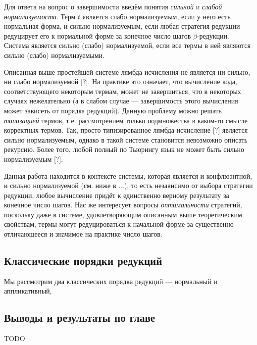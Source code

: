 \documentclass[../diploma.tex]{subfiles}
\begin{document}
Для ответа на вопрос о завершимости введём понятия \textit{сильной} и \textit{слабой нормализуемости}. Терм $t$ является слабо нормализуемым, если у него есть нормальная форма, и сильно нормализуемым, если любая стратегия редукции редуцирует его к нормальной форме за конечное число шагов $\beta$-редукции. Система является сильно (слабо) нормализуемой, если все термы в ней являются сильно (слабо) нормализуемыми.

Описанная выше простейшей системе лямбда-исчисления не является ни сильно, ни слабо нормализуемой [?]. На практике это означает, что вычисление кода, соответствующего некоторым термам, может не завершиться, что в некоторых случаях нежелательно (а в слабом случае --- завершимость этого вычисления может зависеть от порядка редукций). Данную проблему можно решать \textit{типизацией} термов, т.е. рассмотрением только подмножества в каком-то смысле корректных термов. Так, просто типизированное лямбда-исчисление [?] является сильно нормализуемым, однако в такой системе становится невозможно описать рекурсию. Более того, любой полный по Тьюрингу язык не может быть сильно нормализуемым [?].

Данная работа находится в контексте системы, которая является и конфлюэнтной, и сильно нормализуемой (см. ниже в ...), то есть независимо от выбора стратегии редукции, любое вычисление придёт к единственно верному результату за конечное число шагов. Нас же интересует вопросы \textit{оптимальности} стратегий, поскольку даже в системе, удовлетворяющим описанным выше теоретическим свойствам, термы могут редуцироваться к начальной форме за существенно отличающееся и значимое на практике число шагов.

\subsection{Классические порядки редукций}

Мы рассмотрим два классических порядка редукций --- нормальный и аппликативный, 

\subsection{Выводы и результаты по главе}

TODO
\end{document}
